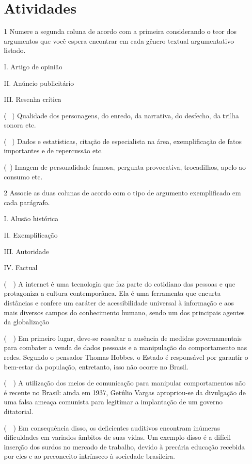 \section{Atividades}

\num{1} Numere a segunda coluna de acordo com a primeira considerando o
teor dos argumentos que você espera encontrar em cada gênero textual
argumentativo listado.

\begin{multicols}{2}
I. Artigo de opinião


II. Anúncio publicitário


III. Resenha crítica 
\columnbreak

(~ ) Qualidade dos personagens, do
enredo, da narrativa, do desfecho, da trilha sonora etc. 

(~ ) Dados e estatísticas, citação de
especialista na área, exemplificação de fatos importantes e de
repercussão etc.

(~) Imagem de
personalidade famosa, pergunta provocativa, trocadilhos, apelo ao
consumo etc.
\end{multicols}

\num{2} Associe as duas colunas de acordo com o tipo de argumento
exemplificado em cada parágrafo.

\begin{multicols}{2}
I. Alusão histórica 

II. Exemplificação

III. Autoridade

IV. Factual
\columnbreak

(~~) A internet é uma tecnologia que faz
parte do cotidiano das pessoas e que protagoniza a cultura
contemporânea. Ela é uma ferramenta que encurta distâncias e confere um
caráter de acessibilidade universal à informação e aos mais diversos
campos do conhecimento humano, sendo um dos principais agentes da
globalização 

(~~) Em primeiro lugar,
deve-se ressaltar a ausência de medidas governamentais para combater a
venda de dados pessoais e a manipulação do comportamento nas redes.
Segundo o pensador Thomas Hobbes, o Estado é responsável por garantir o
bem-estar da população, entretanto, isso não ocorre no Brasil.

(~~) A utilização dos meios de comunicação para
manipular comportamentos não é recente no Brasil: ainda em 1937, Getúlio
Vargas apropriou-se da divulgação de uma falsa ameaça comunista para
legitimar a implantação de um governo ditatorial. 

(~~) Em consequência disso, os deficientes auditivos
encontram inúmeras dificuldades em variados âmbitos de suas vidas. Um
exemplo disso é a difícil inserção dos surdos no mercado de trabalho,
devido à precária educação recebida por eles e ao preconceito intrínseco
à sociedade brasileira.
\end{multicols}


